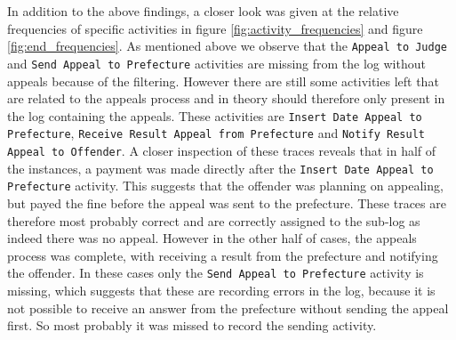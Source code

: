 \documentclass[12pt]{report}
\begin{document}
In addition to the above findings, a closer look was given at the relative frequencies of specific activities in figure \ref{fig:activity_frequencies} and figure \ref{fig:end_frequencies}. As mentioned above we observe that the \texttt{Appeal to Judge} and \texttt{Send Appeal to Prefecture} activities are missing from the log without appeals because of the filtering. However there are still some activities left that are related to the appeals process and in theory should therefore only present in the log containing the appeals. These activities are \texttt{Insert Date Appeal to Prefecture}, \texttt{Receive Result Appeal from Prefecture} and \texttt{Notify Result Appeal to Offender}. A closer inspection of these traces reveals that in half of the instances, a payment was made directly after the \texttt{Insert Date Appeal to Prefecture} activity. This suggests that the offender was planning on appealing, but payed the fine before the appeal was sent to the prefecture. These traces are therefore most probably correct and are correctly assigned to the sub-log as indeed there was no appeal.  However in the other half of cases, the appeals process was complete, with receiving a result from the prefecture and notifying the offender. In these cases only the \texttt{Send Appeal to Prefecture} activity is missing, which suggests that these are recording errors in the log, because it is not possible to receive an answer from the prefecture without sending the appeal first. So most probably it was missed to record the sending activity.
\end{document}
